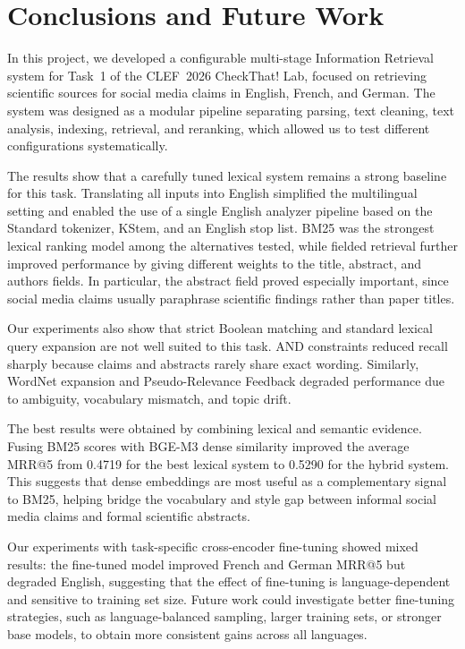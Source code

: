 \section{Conclusions and Future Work}
\label{sec:conclusion}

In this project, we developed a configurable multi-stage Information Retrieval system for Task~1 of the CLEF~2026 CheckThat! Lab, focused on retrieving scientific sources for social media claims in English, French, and German. The system was designed as a modular pipeline separating parsing, text cleaning, text analysis, indexing, retrieval, and reranking, which allowed us to test different configurations systematically.

The results show that a carefully tuned lexical system remains a strong baseline for this task. Translating all inputs into English simplified the multilingual setting and enabled the use of a single English analyzer pipeline based on the Standard tokenizer, KStem, and an English stop list. BM25 was the strongest lexical ranking model among the alternatives tested, while fielded retrieval further improved performance by giving different weights to the title, abstract, and authors fields. In particular, the abstract field proved especially important, since social media claims usually paraphrase scientific findings rather than paper titles.

Our experiments also show that strict Boolean matching and standard lexical query expansion are not well suited to this task. AND constraints reduced recall sharply because claims and abstracts rarely share exact wording. Similarly, WordNet expansion and Pseudo-Relevance Feedback degraded performance due to ambiguity, vocabulary mismatch, and topic drift.

The best results were obtained by combining lexical and semantic evidence. Fusing BM25 scores with BGE-M3 dense similarity improved the average MRR@5 from 0.4719 for the best lexical system to 0.5290 for the hybrid system. This suggests that dense embeddings are most useful as a complementary signal to BM25, helping bridge the vocabulary and style gap between informal social media claims and formal scientific abstracts.

\medskip

Our experiments with task-specific cross-encoder fine-tuning showed mixed results: the fine-tuned model improved French and German MRR@5 but degraded English, suggesting that the effect of fine-tuning is language-dependent and sensitive to training set size. Future work could investigate better fine-tuning strategies, such as language-balanced sampling, larger training sets, or stronger base models, to obtain more consistent gains across all languages.

